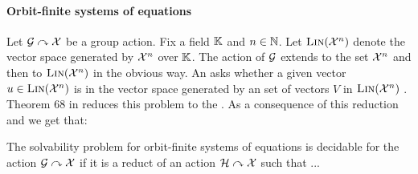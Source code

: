 \paragraph{Orbit-finite systems of equations}
%
Let $\mathcal{G}\curvearrowright\mathcal{X}$ be a group action.
Fix a field $\mathbb{K}$ and $n\in\mathbb{N}$.
Let $\textsc{Lin}(\mathcal{X}^n)$ denote the vector space generated by $\mathcal{X}^n$ over $\mathbb{K}$.
The action of $\mathcal{G}$ extends to the set $\mathcal{X}^n$ and then to $\textsc{Lin}(\mathcal{X}^n)$ in the obvious way.
An  asks whether a given vector $u\in\textsc{Lin}(\mathcal{X}^n)$ is in the vector space generated by an  set of vectors $V$ in $\textsc{Lin}(\mathcal{X}^n)$ \cite[Section 9]{GHOLAS24}.
Theorem 68 in \cite{GHOLAS24} reduces this problem to the .
As a consequence of this reduction and  we get that:
\begin{corollary}\label{cor:lin solv}
The solvability problem for orbit-finite systems of equations is decidable for the action $\mathcal{G}\curvearrowright\mathcal{X}$ if it is a reduct of an action $\mathcal{H}\curvearrowright\mathcal{X}$ such that ...
\end{corollary}


%